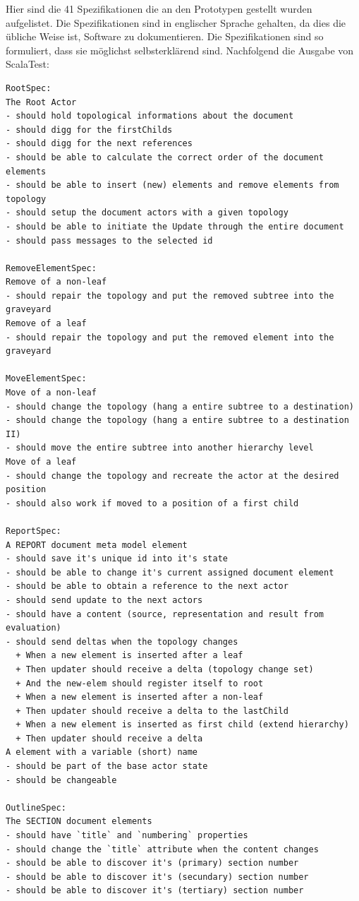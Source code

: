 Hier sind die 41 Spezifikationen die an den Prototypen gestellt wurden aufgelistet. Die Spezifikationen sind in englischer Sprache gehalten, da dies die übliche Weise ist, Software zu dokumentieren. Die Spezifikationen sind so formuliert, dass sie möglichst selbsterklärend sind. Nachfolgend die Ausgabe von ScalaTest:

 
\begin{verbatim}
RootSpec:
The Root Actor
- should hold topological informations about the document
- should digg for the firstChilds
- should digg for the next references
- should be able to calculate the correct order of the document elements
- should be able to insert (new) elements and remove elements from topology
- should setup the document actors with a given topology
- should be able to initiate the Update through the entire document
- should pass messages to the selected id

RemoveElementSpec:
Remove of a non-leaf
- should repair the topology and put the removed subtree into the graveyard
Remove of a leaf
- should repair the topology and put the removed element into the graveyard

MoveElementSpec:
Move of a non-leaf
- should change the topology (hang a entire subtree to a destination)
- should change the topology (hang a entire subtree to a destination II)
- should move the entire subtree into another hierarchy level
Move of a leaf
- should change the topology and recreate the actor at the desired position
- should also work if moved to a position of a first child

ReportSpec:
A REPORT document meta model element
- should save it's unique id into it's state
- should be able to change it's current assigned document element
- should be able to obtain a reference to the next actor
- should send update to the next actors
- should have a content (source, representation and result from evaluation)
- should send deltas when the topology changes
  + When a new element is inserted after a leaf 
  + Then updater should receive a delta (topology change set) 
  + And the new-elem should register itself to root 
  + When a new element is inserted after a non-leaf 
  + Then updater should receive a delta to the lastChild 
  + When a new element is inserted as first child (extend hierarchy) 
  + Then updater should receive a delta 
A element with a variable (short) name
- should be part of the base actor state
- should be changeable

OutlineSpec:
The SECTION document elements
- should have `title` and `numbering` properties
- should change the `title` attribute when the content changes
- should be able to discover it's (primary) section number
- should be able to discover it's (secundary) section number
- should be able to discover it's (tertiary) section number


\end{verbatim}

